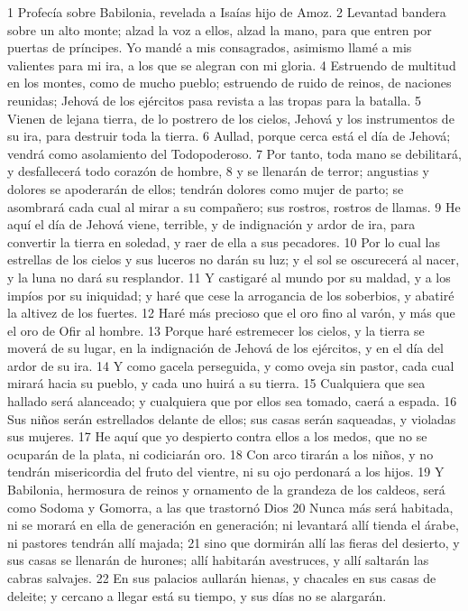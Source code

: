 1 Profecía sobre Babilonia, revelada a Isaías hijo de Amoz.
2 Levantad bandera sobre un alto monte; alzad la voz a ellos, alzad la mano, para que entren por puertas de príncipes. Yo mandé a mis consagrados, asimismo llamé a mis valientes para mi ira, a los que se alegran con mi gloria.
4 Estruendo de multitud en los montes, como de mucho pueblo; estruendo de ruido de reinos, de naciones reunidas; Jehová de los ejércitos pasa revista a las tropas para la batalla.
5 Vienen de lejana tierra, de lo postrero de los cielos, Jehová y los instrumentos de su ira, para destruir toda la tierra.
6 Aullad, porque cerca está el día de Jehová; vendrá como asolamiento del Todopoderoso. 
7 Por tanto, toda mano se debilitará, y desfallecerá todo corazón de hombre,
8 y se llenarán de terror; angustias y dolores se apoderarán de ellos; tendrán dolores como mujer de parto; se asombrará cada cual al mirar a su compañero; sus rostros, rostros de llamas.
9 He aquí el día de Jehová viene, terrible, y de indignación y ardor de ira, para convertir la tierra en soledad, y raer de ella a sus pecadores.
10 Por lo cual las estrellas de los cielos y sus luceros no darán su luz; y el sol se oscurecerá al nacer, y la luna no dará su resplandor. 
11 Y castigaré al mundo por su maldad, y a los impíos por su iniquidad; y haré que cese la arrogancia de los soberbios, y abatiré la altivez de los fuertes.
12 Haré más precioso que el oro fino al varón, y más que el oro de Ofir al hombre.
13 Porque haré estremecer los cielos, y la tierra se moverá de su lugar, en la indignación de Jehová de los ejércitos, y en el día del ardor de su ira.
14 Y como gacela perseguida, y como oveja sin pastor, cada cual mirará hacia su pueblo, y cada uno huirá a su tierra.
15 Cualquiera que sea hallado será alanceado; y cualquiera que por ellos sea tomado, caerá a espada.
16 Sus niños serán estrellados delante de ellos; sus casas serán saqueadas, y violadas sus mujeres.
17 He aquí que yo despierto contra ellos a los medos, que no se ocuparán de la plata, ni codiciarán oro.
18 Con arco tirarán a los niños, y no tendrán misericordia del fruto del vientre, ni su ojo perdonará a los hijos.
19 Y Babilonia, hermosura de reinos y ornamento de la grandeza de los caldeos, será como Sodoma y Gomorra, a las que trastornó Dios 
20 Nunca más será habitada, ni se morará en ella de generación en generación; ni levantará allí tienda el árabe, ni pastores tendrán allí majada;
21 sino que dormirán allí las fieras del desierto, y sus casas se llenarán de hurones; allí habitarán avestruces, y allí saltarán las cabras salvajes.
22 En sus palacios aullarán hienas, y chacales en sus casas de deleite; y cercano a llegar está su tiempo, y sus días no se alargarán.

